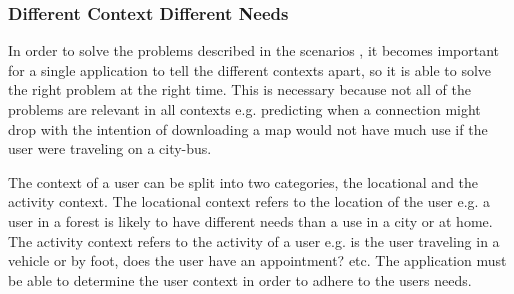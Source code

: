 \subsubsection{Different Context Different Needs}
In order to solve the problems described in the scenarios , it becomes important for a single application to tell the different contexts apart, so it is able to solve the right problem at the right time. This is necessary because not all of the problems are relevant in all contexts e.g. predicting when a connection might drop with the intention of downloading a map would not have much use if the user were traveling on a city-bus.

The context of a user can be split into two categories, the locational and the activity context. The locational context refers to the location of the user e.g. a user in a forest is likely to have different needs than a use in a city or at home. The activity context refers to the activity of a user e.g. is the user traveling in a vehicle or by foot, does the user have an appointment? etc. The application must be able to determine the user context in order to adhere to the users needs.